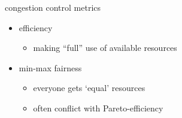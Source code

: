 \begin{frame}{congestion control metrics}
    \begin{itemize}
    \item efficiency
        \begin{itemize}
        \item making ``full'' use of available resources
        \end{itemize}
    \item min-max fairness
        \begin{itemize}
        \item everyone gets `equal' resources
        \item often conflict with Pareto-efficiency
        \end{itemize}
    \end{itemize}
\end{frame}
